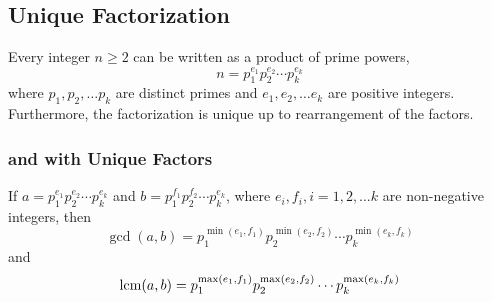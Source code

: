 \subsection{Unique Factorization}\label{subsec:Unique_Factorization}
\begin{theorem}\label{thm:Unique_Factorization_Theorem}
  Every integer $n \geq 2$ can be written as a product of prime powers,
  \begin{equation*}
    n = p_{1}^{e_{1}} p_{2}^{e_{2}} \cdots p_{k}^{e_{k}}
  \end{equation*}
  where $p_{1}, p_{2}, \ldots p_{k}$ are distinct primes and $e_{1}, e_{2}, \ldots e_{k}$ are positive integers.
  Furthermore, the factorization is unique up to rearrangement of the factors.
\end{theorem}

\subsubsection{ and  with Unique Factors}\label{subsubsec:GCD_LCM_Unique_Factors}
If $a = p_{1}^{e_{1}} p_{2}^{e_{2}} \cdots p_{k}^{e_{k}}$ and $b = p_{1}^{f_{1}} p_{2}^{f_{2}} \cdots p_{k}^{e_{k}}$, where $e_{i}, f_{i}, i = 1, 2, \ldots k$ are non-negative integers, then
\begin{equation}\label{eq:GCD_Unique_Factors}
  \gcd(a, b) = p_{1}^{\min(e_{1}, f_{1})} p_{2}^{\min(e_{2}, f_{2})} \cdots p_{k}^{\min(e_{k}, f_{k})}
\end{equation}
and
\begin{equation}\label{eq:LCM_Unique_Factors}
  \operatorname{\operatorname{lcm}}(a, b) = p_{1}^{\max(e_{1}, f_{1})} p_{2}^{\max(e_{2}, f_{2})} \cdots p_{k}^{\max(e_{k}, f_{k})}
\end{equation}

